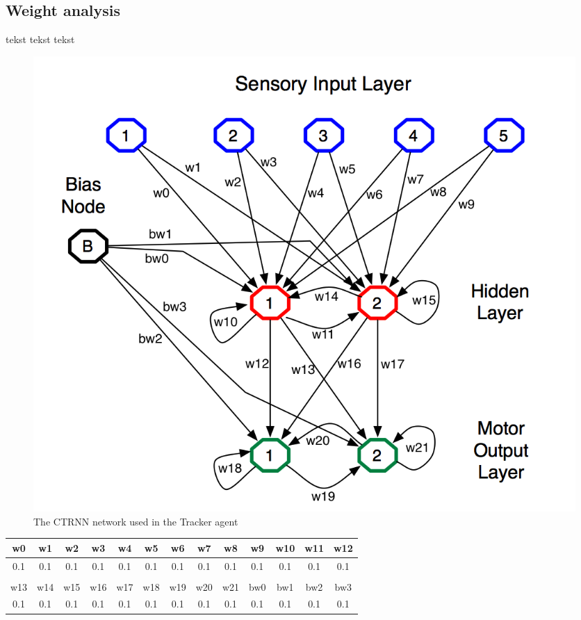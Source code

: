 \subsection{Weight analysis}
tekst tekst tekst

\begin{figure}[h]
  \centering
    \includegraphics[width=1.0\textwidth]{img/CTRNN}
    \caption{The CTRNN network used in the Tracker agent}
\end{figure}

\begin{tabular}{c | c | c | c | c | c | c | c | c | c | c | c | c }

w0  & w1  & w2  & w3  & w4  & w5  & w6  & w7  & w8  & w9  & w10 & w11 & w12 \\
\hline
0.1 & 0.1 & 0.1 & 0.1 & 0.1 & 0.1 & 0.1 & 0.1 & 0.1 & 0.1 & 0.1 & 0.1 & 0.1 \\ \\

w13 & w14 & w15 & w16 & w17 & w18 & w19 & w20 & w21 & bw0 & bw1 & bw2 & bw3 \\
\hline
0.1 & 0.1 & 0.1 & 0.1 & 0.1 & 0.1 & 0.1 & 0.1 & 0.1 & 0.1 & 0.1 & 0.1 & 0.1 \\

\end{tabular}
